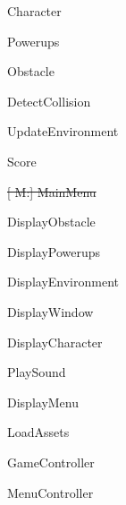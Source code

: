 \documentclass[12pt, titlepage]{article}
\newcounter{mnum}
\newcommand{\mthemnum}{M\themnum}
\begin{document}
\begin{description}
    \item [ \mthemnum \label{m1}:] Character
    \item [ \mthemnum \label{m2}:] Powerups
    \item [ \mthemnum \label{m3}:] Obstacle
    \item [ \mthemnum \label{m4}:] DetectCollision
    \item [ \mthemnum \label{m5}:] UpdateEnvironment
    \item [ \mthemnum \label{m6}:] Score
    \item \sout{[ \mthemnum \label{m7}:] MainMenu}
    \item [\refstepcounter{mnum} \mthemnum \label{m8}:] DisplayObstacle
    \item [\refstepcounter{mnum} \mthemnum \label{m9}:] DisplayPowerups
    \item [\refstepcounter{mnum} \mthemnum \label{m10}:] DisplayEnvironment
    \item [\refstepcounter{mnum} \mthemnum \label{m11}:] DisplayWindow
    \item [\refstepcounter{mnum} \mthemnum \label{m12}:] DisplayCharacter
    \item [\refstepcounter{mnum} \mthemnum \label{m13}:] PlaySound
    \item [\refstepcounter{mnum} \mthemnum \label{m14}:] DisplayMenu
    \item [\refstepcounter{mnum} \mthemnum \label{m15}:] LoadAssets
    \item [\refstepcounter{mnum} \mthemnum \label{m16}:] GameController
    \item [\refstepcounter{mnum} \mthemnum \label{m17}:] MenuController

\end{description}
\end{document}
